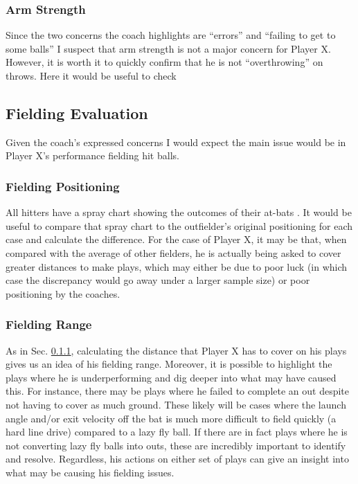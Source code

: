 \documentclass[paper=a4, fontsize=11pt]{scrartcl} %
\numberwithin{equation}{section} %
\numberwithin{figure}{section} %
\numberwithin{table}{section} %
\numberwithin{equation}{subsection}
\begin{document}
\subsubsection{Arm Strength}

Since the two concerns the coach highlights are ``errors'' and ``failing to get to some balls'' I suspect that arm strength is not a major concern for Player X. However, it is worth it to quickly confirm that he is not ``overthrowing'' on throws. Here it would be useful to check 

\subsection{Fielding Evaluation}

Given the coach's expressed concerns I would expect the main issue would be in Player X's performance fielding hit balls.

\subsubsection{Fielding Positioning} \label{subsub:fieldpos}

All hitters have a spray chart showing the outcomes of their at-bats \cite{baseballsavant}. It would be useful to compare that spray chart to the outfielder's original positioning for each case and calculate the difference. For the case of Player X, it may be that, when compared with the average of other fielders, he is actually being asked to cover greater distances to make plays, which may either be due to poor luck (in which case the discrepancy would go away under a larger sample size) or poor positioning by the coaches.  



\subsubsection{Fielding Range} \label{subsub:fieldrange}

As in Sec. \ref{subsub:fieldpos}, calculating the distance that Player X has to cover on his plays gives us an idea of his fielding range. Moreover, it is possible to highlight the plays where he is underperforming and dig deeper into what may have caused this. For instance, there may be plays where he failed to complete an out despite not having to cover as much ground. These likely will be cases where the launch angle and/or exit velocity off the bat is much more difficult to field quickly (a hard line drive) compared to a lazy fly ball. If there are in fact plays where he is not converting lazy fly balls into outs, these are incredibly important to identify and resolve. Regardless, his actions on either set of plays can give an insight into what may be causing his fielding issues.
\end{document}
